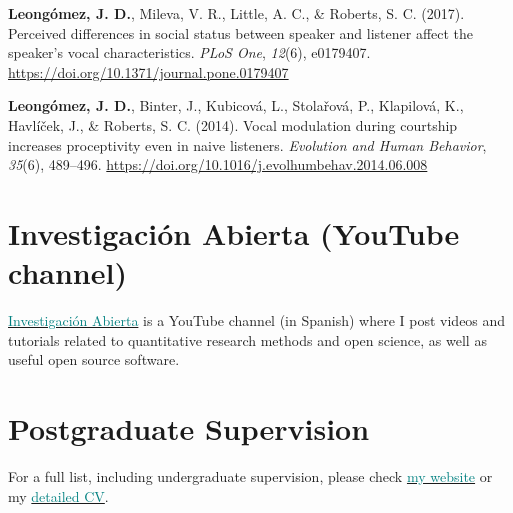 \documentclass[11pt, a4paper]{awesome-cv}
\begin{document}
\leavevmode\hypertarget{ref-Leongomez2017}{}%
\textbf{Leongómez, J. D.}, Mileva, V. R., Little, A. C., \& Roberts, S.
C. (2017). {Perceived differences in social status between speaker and
listener affect the speaker's vocal characteristics}. \emph{PLoS One},
\emph{12}(6), e0179407.
\url{https://doi.org/10.1371/journal.pone.0179407}

\leavevmode\hypertarget{ref-Leongomez2014}{}%
\textbf{Leongómez, J. D.}, Binter, J., Kubicová, L., Stolařová, P.,
Klapilová, K., Havlíček, J., \& Roberts, S. C. (2014). {Vocal modulation
during courtship increases proceptivity even in naive listeners}.
\emph{Evolution and Human Behavior}, \emph{35}(6), 489--496.
\url{https://doi.org/10.1016/j.evolhumbehav.2014.06.008}

\endgroup

\hypertarget{investigaciuxf3n-abierta-youtube-channel}{%
\section{Investigación Abierta (YouTube
channel)}\label{investigaciuxf3n-abierta-youtube-channel}}

\href{https://www.youtube.com/user/juanleongomez/featured}{\textcolor{teal}{Investigación Abierta}}
is a YouTube channel (in Spanish) where I post videos and tutorials
related to quantitative research methods and open science, as well as
useful open source software.

\hypertarget{postgraduate-supervision}{%
\section{Postgraduate Supervision}\label{postgraduate-supervision}}

For a full list, including undergraduate supervision, please check
\href{https://jdleongomez.info/en/team/\#students}{\textcolor{teal}{my website}}
or my
\href{https://jdleongomez.info/en/files/jdl_cv_en.pdf}{\textcolor{teal}{detailed CV}}.
\end{document}

